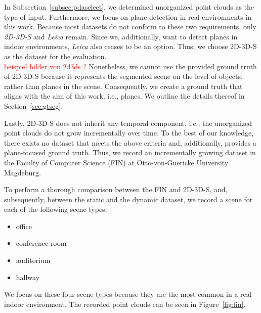 \documentclass[main.tex]{subfiles}
\begin{document}
In Subsection~\ref{subsec:pdaselect}, we determined unorganized point clouds as the type of input. Furthermore, we focus on plane detection in real environments in this work.
Because most datasets do not conform to these two requirements, only \textit{2D-3D-S} and \textit{Leica} remain. Since we, additionally, want to detect planes in indoor environments, 
\textit{Leica} also ceases to be an option. Thus, we choose 2D-3D-S as the dataset for the evaluation.
\textcolor{red}{\\beispiel bilder von 2d3ds ?}\newline
Nonetheless, we cannot use the provided ground truth of 2D-3D-S because it represents the segmented scene on the level of objects, rather than planes in the scene.
Consequently, we create a ground truth that aligns with the aim of this work, i.e., planes. We outline the details thereof in Section~\ref{sec:gtseg}.  

Lastly, 2D-3D-S does not inherit any temporal component, i.e., the unorganized point clouds do not grow incrementally over time. 
To the best of our knowledge, there exists no dataset that meets the above criteria and, additionally, provides a plane-focused ground truth. 
Thus, we record an incrementally growing dataset in the Faculty of Computer Science (FIN) at Otto-von-Guericke University Magdeburg.

To perform a thorough comparison between the FIN and 2D-3D-S, and, subsequently, between the static and the dynamic dataset, we record a scene for each of the following scene types:
\begin{itemize}
    \item office
    \item conference room
    \item auditorium
    \item hallway
\end{itemize}

We focus on these four scene types because they are the most common in a real indoor environment.
The recorded point clouds can be seen in Figure~\ref{fig:fin}.
\end{document}
